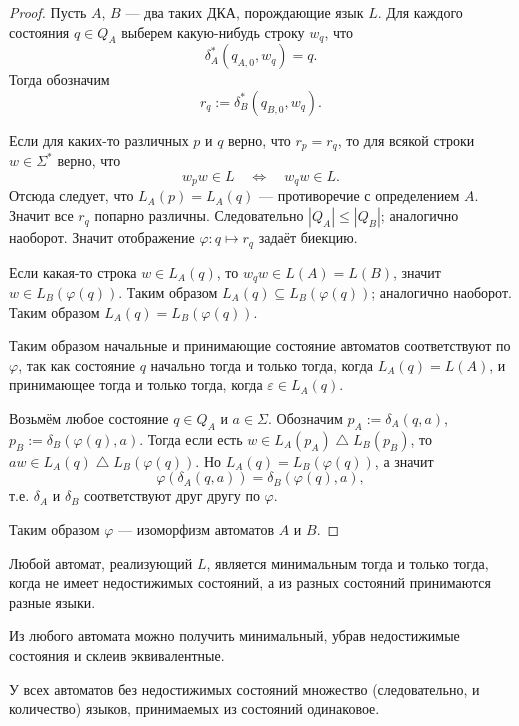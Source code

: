 \documentclass[12pt,a4paper]{article}
\begin{document}
    \begin{proof}
        Пусть $A$, $B$ --- два таких ДКА, порождающие язык $L$. Для каждого состояния $q \in Q_A$ выберем какую-нибудь строку $w_q$, что
        \[\delta_A^*(q_{A, 0}, w_q) = q.\]
        Тогда обозначим
        \[r_q := \delta_B^*(q_{B, 0}, w_q).\]

        Если для каких-то различных $p$ и $q$ верно, что $r_p = r_q$, то для всякой строки $w \in \Sigma^*$ верно, что
        \[w_p w \in L \quad \Longleftrightarrow \quad w_q w \in L.\]
        Отсюда следует, что $L_A(p) = L_A(q)$ --- противоречие с определением $A$. Значит все $r_q$ попарно различны. Следовательно $|Q_A| \leqslant |Q_B|$; аналогично наоборот. Значит отображение $\varphi: q \mapsto r_q$ задаёт биекцию.

        Если какая-то строка $w \in L_A(q)$, то $w_q w \in L(A) = L(B)$, значит $w \in L_B(\varphi(q))$. Таким образом $L_A(q) \subseteq L_B(\varphi(q))$; аналогично наоборот. Таким образом $L_A(q) = L_B(\varphi(q))$.

        Таким образом начальные и принимающие состояние автоматов соответствуют по $\varphi$, так как состояние $q$ начально тогда и только тогда, когда $L_A(q) = L(A)$, и принимающее тогда и только тогда, когда $\varepsilon \in L_A(q)$.

        Возьмём любое состояние $q \in Q_A$ и $a \in \Sigma$. Обозначим $p_A := \delta_A(q, a)$, $p_B := \delta_B(\varphi(q), a)$. Тогда если есть $w \in L_A(p_A) \bigtriangleup L_B(p_B)$, то $aw \in L_A(q) \bigtriangleup L_B(\varphi(q))$. Но $L_A(q) = L_B(\varphi(q))$, а значит
        \[\varphi(\delta_A(q, a)) = \delta_B(\varphi(q), a),\]
        т.е. $\delta_A$ и $\delta_B$ соответствуют друг другу по $\varphi$.

        Таким образом $\varphi$ --- изоморфизм автоматов $A$ и $B$.
    \end{proof}

    \begin{corollary}
        Любой автомат, реализующий $L$, является минимальным тогда и только тогда, когда не имеет недостижимых состояний, а из разных состояний принимаются разные языки.
    \end{corollary}

    \begin{corollary}
        Из любого автомата можно получить минимальный, убрав недостижимые состояния и склеив эквивалентные. 
    \end{corollary}

    \begin{corollary}
        У всех автоматов без недостижимых состояний множество (следовательно, и количество) языков, принимаемых из состояний одинаковое.
    \end{corollary}
\end{document}
